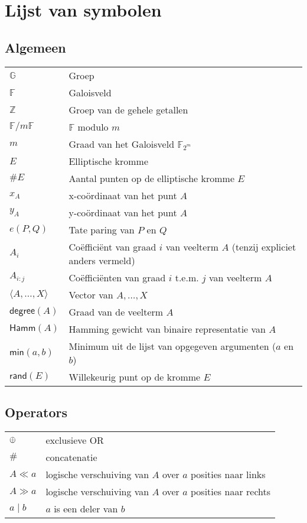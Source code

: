 \chapter*{Lijst van symbolen}

\section*{Algemeen}

\begin{tabular}{l@{$\qquad$}l}
$\mathbb{G}$	& Groep\\
$\mathbb{F}$	& Galoisveld\\
$\mathbb{Z}$	& Groep van de gehele getallen\\
$\mathbb{F}/m\mathbb{F}$	& $\mathbb{F}$ modulo $m$\\
$m$				& Graad van het Galoisveld $\mathbb{F}_{2^m}$\\
$E$				& Elliptische kromme\\
$\#E$				& Aantal punten op de elliptische kromme $E$\\
$x_A$				& x-co\"ordinaat van het punt $A$\\
$y_A$				& y-co\"ordinaat van het punt $A$\\
$e(P, Q)$		& Tate paring van $P$ en $Q$\\
$A_i$				& Co\"effici\"ent van graad $i$ van veelterm $A$ (tenzij expliciet anders vermeld)\\
$A_{i:j}$		& Co\"effici\"enten van graad $i$ t.e.m. $j$ van veelterm $A$\\
$\langle A, \ldots, X \rangle$	& Vector van $A, \ldots, X$\\
$\textsf{degree}(A)$	& Graad van de veelterm $A$\\
$\textsf{Hamm}(A)$	& Hamming gewicht van binaire representatie van $A$\\
$\textsf{min}(a, b)$	& Minimum  uit de lijst van opgegeven argumenten ($a$ en $b$)\\
$\textsf{rand}(E)$	& Willekeurig punt op de kromme $E$\\
\end{tabular}

\section*{Operators}

\begin{tabular}{l@{$\qquad$}l}
$\oplus$	& exclusieve OR\\
$\#$		& concatenatie\\
$A \ll a$	& logische verschuiving van $A$ over $a$ posities naar links\\
$A \gg a$	& logische verschuiving van $A$ over $a$ posities naar rechts\\
$a \mid b$	& $a$ is een deler van $b$\\
\end{tabular}
